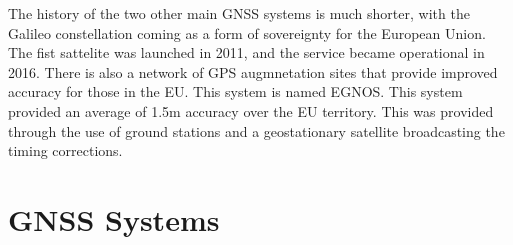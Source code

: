 The history of the two other main GNSS systems is much shorter, with the Galileo constellation coming as a form of sovereignty for the European Union. The fist sattelite
was launched in 2011, and the service became operational in 2016. There is also a network of GPS augmnetation sites that provide improved accuracy for those in the EU.
This system is named EGNOS. This system provided an average of 1.5m accuracy over the EU territory. This was provided through the use of ground stations and a
geostationary satellite broadcasting the timing corrections. 


\section{GNSS Systems} \label{sec:GNSS}
